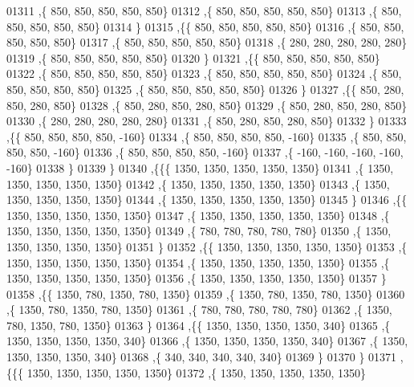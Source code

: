 \begin{DoxyCode}
01311    ,\{   850,   850,   850,   850,   850\}
01312    ,\{   850,   850,   850,   850,   850\}
01313    ,\{   850,   850,   850,   850,   850\}
01314    \}
01315   ,\{\{   850,   850,   850,   850,   850\}
01316    ,\{   850,   850,   850,   850,   850\}
01317    ,\{   850,   850,   850,   850,   850\}
01318    ,\{   280,   280,   280,   280,   280\}
01319    ,\{   850,   850,   850,   850,   850\}
01320    \}
01321   ,\{\{   850,   850,   850,   850,   850\}
01322    ,\{   850,   850,   850,   850,   850\}
01323    ,\{   850,   850,   850,   850,   850\}
01324    ,\{   850,   850,   850,   850,   850\}
01325    ,\{   850,   850,   850,   850,   850\}
01326    \}
01327   ,\{\{   850,   280,   850,   280,   850\}
01328    ,\{   850,   280,   850,   280,   850\}
01329    ,\{   850,   280,   850,   280,   850\}
01330    ,\{   280,   280,   280,   280,   280\}
01331    ,\{   850,   280,   850,   280,   850\}
01332    \}
01333   ,\{\{   850,   850,   850,   850,  -160\}
01334    ,\{   850,   850,   850,   850,  -160\}
01335    ,\{   850,   850,   850,   850,  -160\}
01336    ,\{   850,   850,   850,   850,  -160\}
01337    ,\{  -160,  -160,  -160,  -160,  -160\}
01338    \}
01339   \}
01340  ,\{\{\{  1350,  1350,  1350,  1350,  1350\}
01341    ,\{  1350,  1350,  1350,  1350,  1350\}
01342    ,\{  1350,  1350,  1350,  1350,  1350\}
01343    ,\{  1350,  1350,  1350,  1350,  1350\}
01344    ,\{  1350,  1350,  1350,  1350,  1350\}
01345    \}
01346   ,\{\{  1350,  1350,  1350,  1350,  1350\}
01347    ,\{  1350,  1350,  1350,  1350,  1350\}
01348    ,\{  1350,  1350,  1350,  1350,  1350\}
01349    ,\{   780,   780,   780,   780,   780\}
01350    ,\{  1350,  1350,  1350,  1350,  1350\}
01351    \}
01352   ,\{\{  1350,  1350,  1350,  1350,  1350\}
01353    ,\{  1350,  1350,  1350,  1350,  1350\}
01354    ,\{  1350,  1350,  1350,  1350,  1350\}
01355    ,\{  1350,  1350,  1350,  1350,  1350\}
01356    ,\{  1350,  1350,  1350,  1350,  1350\}
01357    \}
01358   ,\{\{  1350,   780,  1350,   780,  1350\}
01359    ,\{  1350,   780,  1350,   780,  1350\}
01360    ,\{  1350,   780,  1350,   780,  1350\}
01361    ,\{   780,   780,   780,   780,   780\}
01362    ,\{  1350,   780,  1350,   780,  1350\}
01363    \}
01364   ,\{\{  1350,  1350,  1350,  1350,   340\}
01365    ,\{  1350,  1350,  1350,  1350,   340\}
01366    ,\{  1350,  1350,  1350,  1350,   340\}
01367    ,\{  1350,  1350,  1350,  1350,   340\}
01368    ,\{   340,   340,   340,   340,   340\}
01369    \}
01370   \}
01371  ,\{\{\{  1350,  1350,  1350,  1350,  1350\}
01372    ,\{  1350,  1350,  1350,  1350,  1350\}

\end{DoxyCode}
